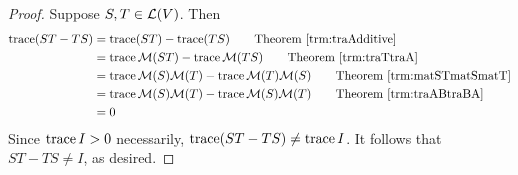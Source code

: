 \documentclass[../main.tex]{subfiles}
\begin{document}
\begin{itemize}
\begin{theorem}
        \begin{proof}
            Suppose $S,T\in\mathcal{L}(V)$. Then
            \begin{align*}
                \tra(ST-TS) &= \tra(ST)-\tra(TS)\tag*{Theorem \ref{trm:traAdditive}}\\
                &= \tra\mat{ST}-\tra\mat{TS}\tag*{Theorem \ref{trm:traTtraA}}\\
                &= \tra\mat{S}\mat{T}-\tra\mat{T}\mat{S}\tag*{Theorem \ref{trm:matSTmatSmatT}}\\
                &= \tra\mat{S}\mat{T}-\tra\mat{S}\mat{T}\tag*{Theorem \ref{trm:traABtraBA}}\\
                &= 0
            \end{align*}
            Since $\operatorname{trace} I>0$ necessarily, $\operatorname{trace}(ST-TS)\neq\operatorname{trace} I$. It follows that $ST-TS\neq I$, as desired.
        \end{proof}
    \end{theorem}
\end{itemize}
\end{document}
